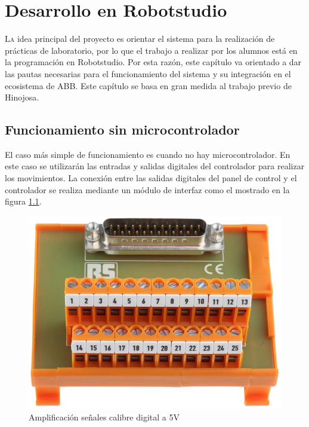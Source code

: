 \chapter{Desarrollo en Robotstudio}\label{chp-06}

\lettrine[lraise=-0.1, lines=2, loversize=0.2]{L}a idea principal del proyecto es orientar el sistema para la realización de prácticas de 
laboratorio, por lo que el trabajo a realizar por los alumnos está en la programación en 
Robotstudio. Por esta razón, este capítulo va orientado a dar las pautas necesarias para el 
funcionamiento del sistema y su integración en el ecosistema de ABB. Este capítulo se basa 
en gran medida al trabajo previo de Hinojosa\cite{rea}.

\section{Funcionamiento sin microcontrolador}

El caso más simple de funcionamiento es cuando no hay microcontrolador. En este caso se
utilizarán las entradas y salidas digitales del controlador para realizar los movimientos.
La conexión entre las salidas digitales del panel de control y el controlador se realiza mediante 
un módulo de interfaz como el mostrado en la figura \ref{fig:interfazfisicadigital}.

\begin{figure}[hbtp]
    \centering
    \includegraphics[width=\textwidth/2]{06-robotstudio/interfazdigital.jpg}
    \caption{Amplificación señales calibre digital a 5V}
    \label{fig:interfazfisicadigital}
    \end{figure}

